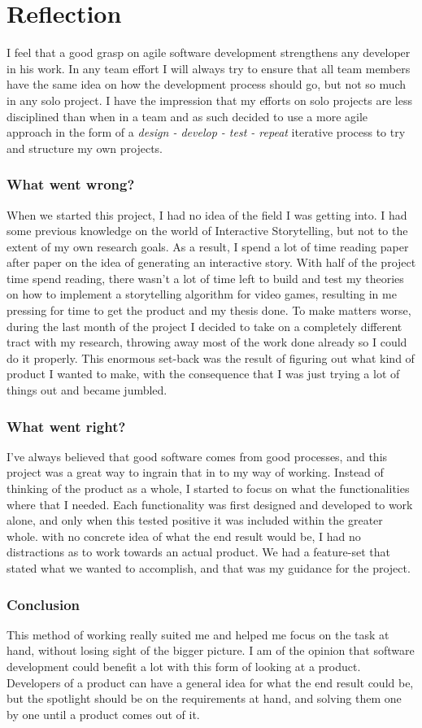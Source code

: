 \chapter*{Reflection}
I feel that a good grasp on agile software development strengthens any developer in his work.
In any team effort I will always try to ensure that all team members have the same idea on how the development process should go, but not so much in any solo project.
I have the impression that my efforts on solo projects are less disciplined than when in a team and as such decided to use a more agile approach in the form of a \textit{design - develop - test - repeat} iterative process to try and structure my own projects.
\subsection*{What went wrong?}
When we started this project, I had no idea of the field I was getting into. 
I had some previous knowledge on the world of Interactive Storytelling, but not to the extent of my own research goals.
As a result, I spend a lot of time reading paper after paper on the idea of generating an interactive story.
With half of the project time spend reading, there wasn't a lot of time left to build and test my theories on how to implement a storytelling algorithm for video games, resulting in me pressing for time to get the product and my thesis done.
To make matters worse, during the last month of the project I decided to take on a completely different tract with my research, throwing away most of the work done already so I could do it properly.
This enormous set-back was the result of figuring out what kind of product I wanted to make, with the consequence that I was just trying a lot of things out and became jumbled.
\subsection*{What went right?}
I've always believed that good software comes from good processes, and this project was a great way to ingrain that in to my way of working. 
Instead of thinking of the product as a whole, I started to focus on what the functionalities where that I needed.
Each functionality was first designed and developed to work alone, and only when this tested positive it was included within the greater whole.
with no concrete idea of what the end result would be, I had no distractions as to work towards an actual product.
We had a feature-set that stated what we wanted to accomplish, and that was my guidance for the project.
\subsection*{Conclusion}
This method of working really suited me and helped me focus on the task at hand, without losing sight of the bigger picture.
I am of the opinion that software development could benefit a lot with this form of looking at a product.
Developers of a product can have a general idea for what the end result could be, but the spotlight should be on the requirements at hand, and solving them one by one until a product comes out of it. 